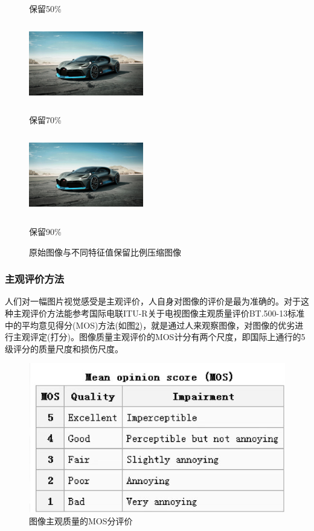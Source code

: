 \documentclass{hfutpaper}
\begin{document}
\begin{figure}[htbp]
\begin{minipage}{0.32\linewidth}
		\centerline{保留50\%}	
	\end{minipage}
	\begin{minipage}{0.32\linewidth}	
		\vspace{3pt}	
		\centerline{\includegraphics[width=5cm,height=3.5cm]{test7.jpeg}}	
		\centerline{保留70\%}	
	\end{minipage}
	\begin{minipage}{0.32\linewidth}	
		\vspace{3pt}	
		\centerline{\includegraphics[width=5cm,height=3.5cm]{test9.jpeg}}		
		\centerline{保留90\%}	
	\end{minipage}
	\caption{原始图像与不同特征值保留比例压缩图像}
	\label{fig4}
\end{figure}
\subsubsection{主观评价方法}
人们对一幅图片视觉感受是主观评价，人自身对图像的评价是最为准确的。对于这种主观评价方法能参考国际电联ITU-R关于电视图像主观质量评价BT.500-13标准中的平均意见得分(MOS)方法(如图\ref{fig1})，就是通过人来观察图像，对图像的优劣进行主观评定(打分)。图像质量主观评价的MOS计分有两个尺度，即国际上通行的5级评分的质量尺度和损伤尺度。
\begin{figure}[H]
	\centering
	\includegraphics[scale=0.4]{MOS}
	\caption{图像主观质量的MOS分评价}
	\label{fig1}
\end{figure}
\end{document}
